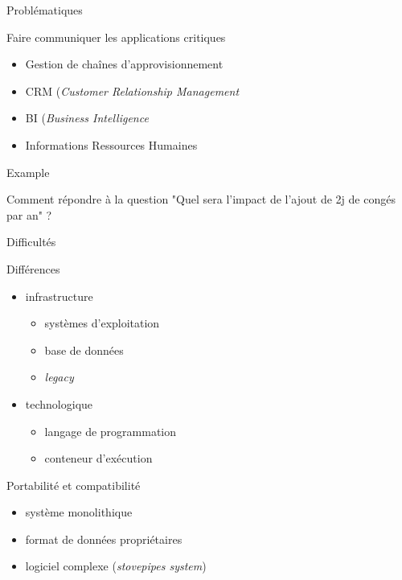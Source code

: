 
\begin{frame}{Problématiques}
  \begin{block}{Faire communiquer les applications critiques}
    \begin{itemize}
      \item Gestion de chaînes d'approvisionnement
      \item CRM (\textit{Customer Relationship Management}
      \item BI (\textit{Business Intelligence}
      \item Informations Ressources Humaines
    \end{itemize}
  \end{block}

  \begin{block}{Example}
    \begin{center}
      Comment répondre à la question "Quel sera l'impact de l'ajout de 2j de congés par an" ?
    \end{center}
  \end{block}
\end{frame}

\begin{frame}{Difficultés}
  \begin{block}{Différences}
    \begin{itemize}
      \item infrastructure
      \begin{itemize}
        \item systèmes d'exploitation
        \item base de données
        \item \textit{legacy}
      \end{itemize}
      \item technologique
      \begin{itemize}
        \item langage de programmation
        \item conteneur d'exécution
      \end{itemize}
    \end{itemize}
  \end{block}

  \begin{block}{Portabilité et compatibilité}
    \begin{itemize}
      \item système monolithique
      \item format de données propriétaires
      \item logiciel complexe (\textit{stovepipes system})
    \end{itemize}
  \end{block}
\end{frame}

